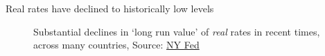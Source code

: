 \begin{frame}{Real rates have declined to historically low levels}

\begin{figure}
\begin{center}


\end{center}
\caption{Substantial declines in `long run value' of \textit{real} rates in recent times, across many countries, Source: \href{https://voxeu.org/article/global-trends-interest-rates}{NY Fed}}
\end{figure}

\end{frame}



